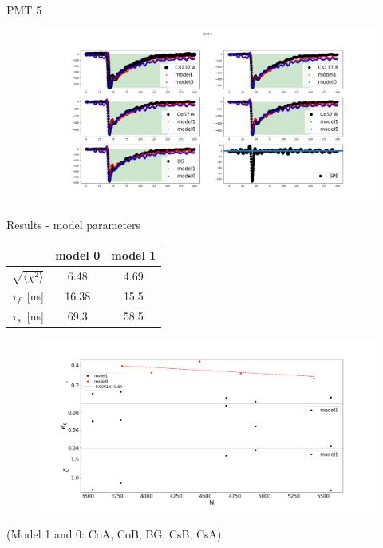 \documentclass{beamer}
\begin{document}
\begin{frame}{PMT 5}
\begin{figure}[H]
  \includegraphics[width=\linewidth]{wf5.png}
\end{figure}
\end{frame}

\begin{frame}{Results - model parameters}

\begin{center}
\begin{tabular}{ |c||c|c| } 
 \hline
 & model 0 & model 1\\ 
 \hline
 \hline
 $\sqrt{\langle\chi^2\rangle}$ & 6.48 &  4.69 \\ 
 \hline
 $\tau_f$~[ns] & 16.38 &  15.5 \\ 
 \hline
  $\tau_s$~[ns] & 69.3 &  58.5 \\ 
 \hline
\end{tabular}
\end{center}
\begin{figure}[h]
  \includegraphics[width=\linewidth]{params.png}
\end{figure}
\tiny{(Model 1 and 0: CoA, CoB, BG, CsB, CsA)}\\
\end{frame}
\end{document}
